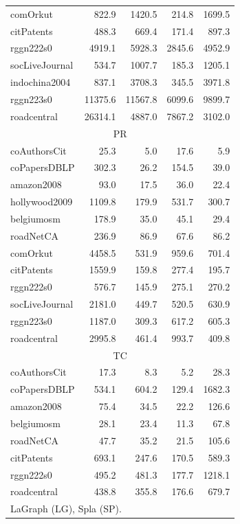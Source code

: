 \begin{table}[tbp]
\begin{center}
\begin{tabular}{|l|r|r|r|r|}
    \rowcolor{black!10} comOrkut&822.9&1420.5&214.8&1699.5\\
    \rowcolor{black!2 } citPatents&488.3&669.4&171.4&897.3\\
    \rowcolor{black!10} rggn222s0&4919.1&5928.3&2845.6&4952.9\\
    \rowcolor{black!2 } socLiveJournal&534.7&1007.7&185.3&1205.1\\
    \rowcolor{black!10} indochina2004&837.1&3708.3&345.5&3971.8\\
    \rowcolor{black!2 } rggn223s0&11375.6&11567.8&6099.6&9899.7\\
    \rowcolor{black!10} roadcentral&26314.1&4887.0&7867.2&3102.0\\
    \hline
    \hline
    \multicolumn{5}{|c|}{PR} \\
    \hline
    \rowcolor{black!10} coAuthorsCit&25.3&5.0&17.6&5.9\\
    \rowcolor{black!2 } coPapersDBLP&302.3&26.2&154.5&39.0\\
    \rowcolor{black!10} amazon2008&93.0&17.5&36.0&22.4\\
    \rowcolor{black!2 } hollywood2009&1109.8&179.9&531.7&300.7\\
    \rowcolor{black!10} belgiumosm&178.9&35.0&45.1&29.4\\
    \rowcolor{black!2 } roadNetCA&236.9&86.9&67.6&86.2\\
    \rowcolor{black!10} comOrkut&4458.5&531.9&959.6&701.4\\
    \rowcolor{black!2 } citPatents&1559.9&159.8&277.4&195.7\\
    \rowcolor{black!10} rggn222s0&576.7&145.9&275.1&270.2\\
    \rowcolor{black!2 } socLiveJournal&2181.0&449.7&520.5&630.9\\
    \rowcolor{black!10} rggn223s0&1187.0&309.3&617.2&605.3\\
    \rowcolor{black!2 } roadcentral&2995.8&461.4&993.7&409.8\\
    \hline
    \hline
    \multicolumn{5}{|c|}{TC} \\
    \hline
    \rowcolor{black!10} coAuthorsCit&17.3&8.3&5.2&28.3\\
    \rowcolor{black!2 } coPapersDBLP&534.1&604.2&129.4&1682.3\\
    \rowcolor{black!10} amazon2008&75.4&34.5&22.2&126.6\\
    \rowcolor{black!2 } belgiumosm&28.1&23.4&11.3&67.8\\
    \rowcolor{black!10} roadNetCA&47.7&35.2&21.5&105.6\\
    \rowcolor{black!2 } citPatents&693.1&247.6&170.5&589.3\\
    \rowcolor{black!10} rggn222s0&495.2&481.3&177.7&1218.1\\
    \rowcolor{black!2 } roadcentral&438.8&355.8&176.6&679.7\\
    \hline
    \hline
    \multicolumn{5}{l}{LaGraph (LG), Spla (SP).} \\
    \end{tabular}
    \label{rq3_table}
\end{center}
\end{table}

